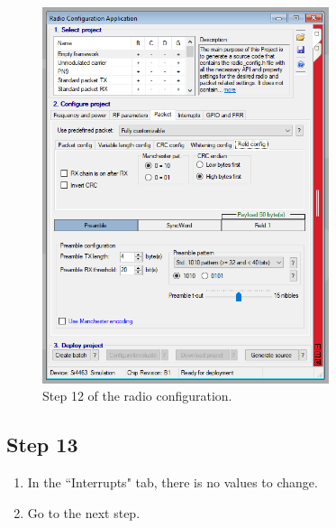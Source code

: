 \documentclass[12pt]{book}
\begin{document}
\begin{appendices}
\begin{figure}[!h]
	\begin{center}
		\includegraphics[width=0.75\textwidth]{figures/wds-tutorial-12.png}
		\caption{Step 12 of the radio configuration.}
		\label{fig:wds-tutorial-step-12}
	\end{center}
\end{figure}

\subsection{Step 13}

\begin{enumerate}
    \item In the ``Interrupts" tab, there is no values to change.
    \item Go to the next step.
\end{enumerate}


\end{appendices}
\end{document}
